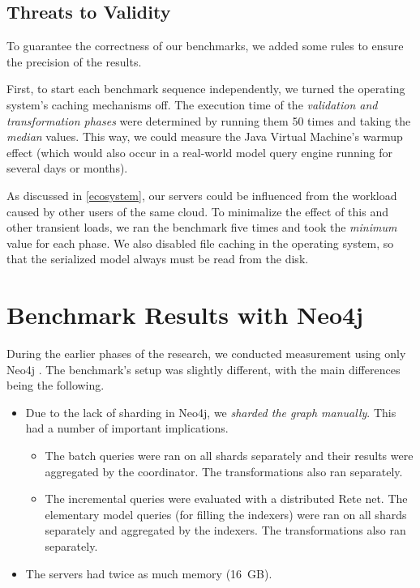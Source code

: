 \subsection{Threats to Validity}
\label{threats-to-validity}

To guarantee the correctness of our benchmarks, we added some rules to ensure the precision of the results.

First, to start each benchmark sequence independently, we turned the operating system's caching mechanisms off. The execution time of the \emph{validation and transformation phases} were determined by running them 50 times and taking the \emph{median} values. This way, we could measure the Java Virtual Machine's warmup effect (which would also occur in a real-world model query engine running for several days or months).

As discussed in \autoref{ecosystem}, our servers could be influenced from the workload caused by other users of the same cloud. To minimalize the effect of this and other transient loads, we ran the benchmark five times and took the \emph{minimum} value for each phase. We also disabled file caching in the operating system, so that the serialized model always must be read from the disk.



\section{Benchmark Results with Neo4j}

During the earlier phases of the research, we conducted measurement using only Neo4j \cite{Izso:2012:ODD:2428516.2428523}. The benchmark's setup was slightly different, with the main differences being the following.

\begin{itemize}
  \item Due to the lack of sharding in Neo4j, we \emph{sharded the graph manually}. This had a number of important implications.
  \begin{itemize}
    \item The batch queries were ran on all shards separately and their results were aggregated by the coordinator. The transformations also ran separately. 
    \item The incremental queries were evaluated with a distributed Rete net. The elementary model queries (for filling the indexers) were ran on all shards separately and aggregated by the indexers. The transformations also ran separately.
  \end{itemize}
  \item The servers had twice as much memory (16~GB).
\end{itemize}

